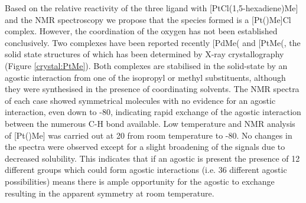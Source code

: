 Based on the relative reactivity of the three \tBuxantphos{} ligand with [PtCl(1,5-hexadiene)Me] and the NMR spectroscopy we propose that the species formed is a [Pt(\tBuxantphos)Me]Cl complex.  However, the coordination of the oxygen has not been established conclusively.  Two complexes have been reported recently [PdMe(\ce{P^{t}Bu3)2]+} and [PtMe(\ce{P^{i}Pr3)2]+}, the solid state structures of which has been determined by X-ray crystallography (Figure \ref{crystal:PtMe}).\cite{Ingleson2004, Walter2013}  Both complexes are stabilised in the solid-state by an agostic interaction from one of the isopropyl or \tBu{} methyl substituents, although they were synthesised in the presence of coordinating solvents.  The NMR spectra of each case showed symmetrical molecules with no evidence for an agostic interaction, even down to -80\degC, indicating rapid exchange of the agostic interaction between the numerous C-H bond available.  Low temperature \proton{} and \phosphorus{} NMR analysis of [Pt(\tBusixantphos)Me] was carried out at 20\degC{} from room temperature to -80\degC.  No changes in the spectra were observed except for a slight broadening of the signals due to decreased solubility.  This indicates that if an agostic is present the presence of 12 different \tBu{}  groups which could form agostic interactions (i.e. 36 different agostic possibilities) means there is ample opportunity for the agostic to exchange resulting in the apparent symmetry at room temperature.  

